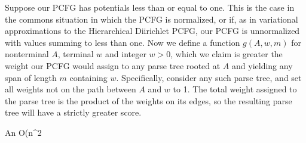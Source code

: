 \documentclass{article}
\begin{document}
Suppose our PCFG has potentials less than or equal to one. This is the
case in the commons situation in which the PCFG is normalized, or if,
as in variational approximations to the Hierarchical Diirichlet PCFG,
our PCFG is unnormalized with values summing to less than one. Now we
define a function $g(A, w, m)$ for nonterminal $A$, terminal $w$ and
integer $w>0$, which we claim is greater the weight our PCFG would
assign to any parse tree rooted at $A$ and yielding any span of length
$m$ containing $w$. Specifically, consider any such parse tree, and
set all weights not on the path between $A$ and $w$ to 1. The total
weight assigned to the parse tree is the product of the weights on its
edges, so the resulting parse tree will have a strictly greater score.





\begin{algorithm}
\caption{An O(n^2}
\begin{algorithmic}[2]

\EndProcedure
\end{algorithmic}
\end{algorithm}
\end{document}
